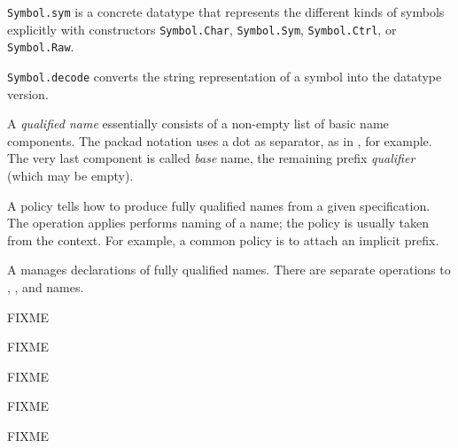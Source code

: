 \begin{isabellebody}
\begin{isamarkuptext}
\begin{description}
  \item \verb|Symbol.sym| is a concrete datatype that represents
  the different kinds of symbols explicitly with constructors \verb|Symbol.Char|, \verb|Symbol.Sym|, \verb|Symbol.Ctrl|, or \verb|Symbol.Raw|.

  \item \verb|Symbol.decode| converts the string representation of a
  symbol into the datatype version.

  \end{description}%
\end{isamarkuptext}%
\isamarkuptrue%
%
\endisatagmlref
{\isafoldmlref}%
%
\isadelimmlref
%
\endisadelimmlref
%
\isamarkuptrue%
%
\begin{isamarkuptext}%
A \emph{qualified name} essentially consists of a non-empty list of
  basic name components.  The packad notation uses a dot as separator,
  as in , for example.  The very last component is called
  \emph{base} name, the remaining prefix \emph{qualifier} (which may
  be empty).

  A  policy tells how to produce fully qualified names
  from a given specification.  The  operation applies
  performs naming of a name; the policy is usually taken from the
  context.  For example, a common policy is to attach an implicit
  prefix.

  A  manages declarations of fully qualified
  names.  There are separate operations to , , and  names.

  FIXME%
\end{isamarkuptext}%
\isamarkuptrue%
%
\isadelimmlref
%
\endisadelimmlref
%
\isatagmlref
%
\begin{isamarkuptext}%
FIXME%
\end{isamarkuptext}%
\isamarkuptrue%
%
\endisatagmlref
{\isafoldmlref}%
%
\isadelimmlref
%
\endisadelimmlref
%
\isamarkuptrue%
%
\isamarkuptrue%
%
\begin{isamarkuptext}%
FIXME%
\end{isamarkuptext}%
\isamarkuptrue%
%
\isamarkuptrue%
%
\begin{isamarkuptext}%
FIXME%
\end{isamarkuptext}%
\isamarkuptrue%
%
\isamarkuptrue%
%
\begin{isamarkuptext}%
FIXME%
\end{isamarkuptext}%
\isamarkuptrue%
%
\isadelimtheory
%
\endisadelimtheory
%
\isatagtheory
{}\isamarkupfalse%
%
\endisatagtheory
{\isafoldtheory}%
%
\isadelimtheory
%
\endisadelimtheory
\isanewline
\end{isabellebody}%
